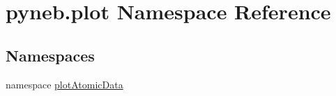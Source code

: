 \hypertarget{namespacepyneb_1_1plot}{\section{pyneb.\-plot Namespace Reference}
\label{namespacepyneb_1_1plot}
}
\subsection*{Namespaces}
\begin{DoxyCompactItemize}
\item 
namespace \hyperlink{namespacepyneb_1_1plot_1_1plot_atomic_data}{plot\-Atomic\-Data}
\end{DoxyCompactItemize}
